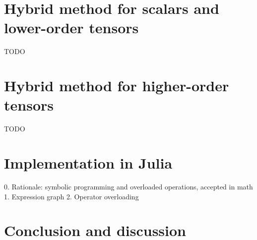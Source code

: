 \documentclass[conference]{IEEEtran}
\begin{document}
\section{Hybrid method for scalars and lower-order tensors}

TODO

\section{Hybrid method for higher-order tensors}

TODO

\section{Implementation in Julia}

0. Rationale: symbolic programming and overloaded operations, accepted in math
1. Expression graph
2. Operator overloading

\newpage

\section{Conclusion and discussion}





 




\end{document}
